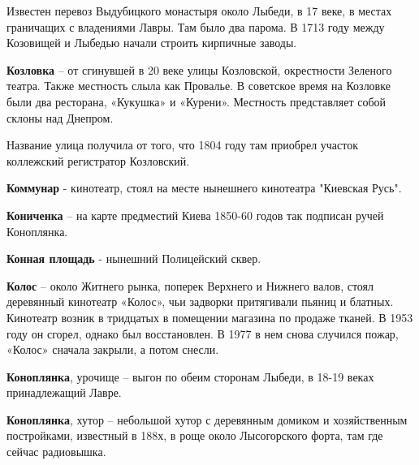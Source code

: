 
Известен перевоз Выдубицкого монастыря около Лыбеди, в 17 веке, в местах граничащих с владениями Лавры. Там было два парома. В 1713 году между Козовищей и Лыбедью начали строить кирпичные заводы.\\

\medskip


\textbf{Козловка} – от сгинувшей в 20 веке улицы Козловской, окрестности Зеленого театра. Также местность слыла как Провалье. В советское время на Козловке были два ресторана, «Кукушка» и «Курени». Местность представляет собой склоны над Днепром.

Название улица получила от того, что 1804 году там приобрел участок коллежский регистратор Козловский.\\

\medskip


\textbf{Коммунар} - кинотеатр, стоял на месте нынешнего кинотеатра "Киевская Русь".\\

\medskip


\textbf{Кониченка} – на карте предместий Киева 1850-60 годов так подписан ручей Коноплянка.\\

\medskip

\textbf{Конная площадь} - нынешний Полицейский сквер.\\

\medskip

\textbf{Колос} – около Житнего рынка, поперек Верхнего и Нижнего валов, стоял деревянный кинотеатр «Колос», чьи задворки притягивали пьяниц и блатных. Кинотеатр возник в тридцатых в помещении магазина по продаже тканей. В 1953 году он сгорел, однако был восстановлен. В 1977 в нем снова случился пожар, «Колос» сначала закрыли, а потом снесли.\\

\medskip

\textbf{Коноплянка}, урочище – выгон по обеим сторонам Лыбеди, в 18-19 веках принадлежащий Лавре.\\

\medskip

\textbf{Коноплянка}, хутор – небольшой хутор с деревянным домиком и хозяйственным постройками, известный в 188х, в роще около Лысогорского форта, там где сейчас радиовышка.\\  

